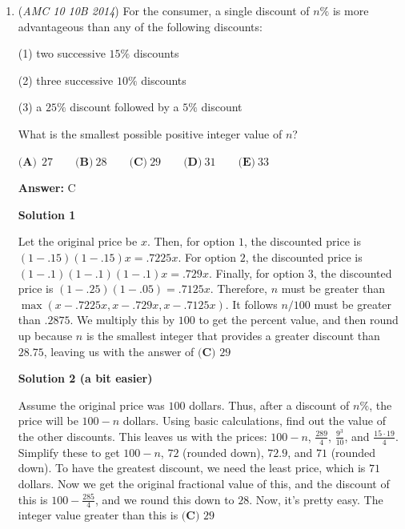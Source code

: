 \begin{enumerate}
 Since all digits must be distinct and $C = 0$, the smallest possible non-zero digits we can choose for $A$ and $B$ are $1$ and $2$. This means the minimum value of $A+B = D$ is $1+2=3$. Since $D$ must remain a single digit, the maximum value of $D$ is $9$. 

 Thus, there are $9 - 3 + 1$ values of $D$, which implies $\boxed{\textbf{(C) }7}$.

 


 


	\item (\textit{AMC 10 10B 2014}) For the consumer, a single discount of $n\%$ is more advantageous than any of the following discounts:


 (1) two successive $15\%$  discounts


 (2) three successive $10\%$ discounts


 (3) a $25\%$ discount followed by a $5\%$ discount


 What is the smallest possible positive integer value of $n$?


 $\textbf{(A)}\ \ 27\qquad\textbf{(B)}\ 28\qquad\textbf{(C)}\ 29\qquad\textbf{(D)}\ 31\qquad\textbf{(E)}\ 33$

 \textbf{Answer: }C



\textbf{Solution 1}

Let the original price be $x$. Then, for option $1$, the discounted price is $(1-.15)(1-.15)x = .7225x$. For option $2$, the discounted price is $(1-.1)(1-.1)(1-.1)x = .729x$. Finally, for option $3$, the discounted price is $(1-.25)(1-.05) = .7125x$. Therefore, $n$ must be greater than $\max(x - .7225x, x-.729x, x-.7125x)$. It follows $n/100$ must be greater than $.2875$. We multiply this by $100$ to get the percent value, and then round up because $n$ is the smallest integer that provides a greater discount than $28.75$, leaving us with the answer of $\boxed{\textbf{(C) } 29}$




\textbf{Solution 2 (a bit easier)}

Assume the original price was $100$ dollars. Thus, after a discount of $n\%$, the price will be $100-n$ dollars. Using basic calculations, find out the value of the other discounts. This leaves us with the prices: $100-n$, $\frac{289}{4}$, $\frac{9^3}{10}$, and $\frac{15\cdot19}{4}$. Simplify these to get $100-n$, $72$ (rounded down), $72.9$, and $71$ (rounded down). To have the greatest discount, we need the least price, which is $71$ dollars. Now we get the original fractional value of this, and the discount of this is $100-\frac{285}{4}$, and we round this down to $28$. Now, it's pretty easy. The integer value greater than this is $\boxed{\textbf{(C) } 29}$





\end{enumerate}
